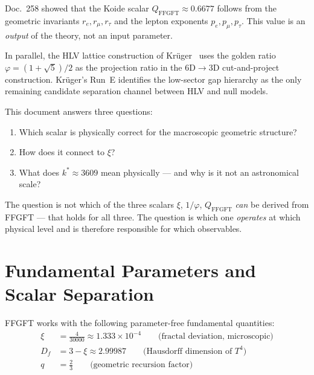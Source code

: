 Doc.~258 showed that the Koide scalar
$Q_\mathrm{FFGFT} \approx 0.6677$ follows from the geometric invariants
$r_e, r_\mu, r_\tau$ and the lepton exponents $p_e, p_\mu, p_\tau$.
This value is an \emph{output} of the theory, not an input parameter.

In parallel, the HLV lattice construction of Krüger~\cite{krueger275en}
uses the golden ratio $\varphi = (1+\sqrt{5})/2$ as the projection ratio
in the 6D$\to$3D cut-and-project construction. Krüger's Run~E identifies
the low-sector gap hierarchy as the only remaining candidate separation
channel between HLV and null models.

This document answers three questions:
\begin{enumerate}
  \item Which scalar is physically correct for the macroscopic geometric
        structure?
  \item How does it connect to $\xi$?
  \item What does $k^* \approx 3609$ mean physically --- and why is it
        not an astronomical scale?
\end{enumerate}

\begin{remark}
The question is not which of the three scalars $\xi$, $1/\varphi$,
$Q_\mathrm{FFGFT}$ \emph{can} be derived from FFGFT --- that holds for
all three. The question is which one \emph{operates} at which physical
level and is therefore responsible for which observables.
\end{remark}

\section{Fundamental Parameters and Scalar Separation}

FFGFT works with the following parameter-free fundamental quantities:
\begin{align}
  \xi   &= \frac{4}{30000} \approx 1.333 \times 10^{-4}
    \qquad \text{(fractal deviation, microscopic)} \label{eq:xi275en}\\
  D_f   &= 3 - \xi \approx 2.99987
    \qquad \text{(Hausdorff dimension of }T^4\text{)} \label{eq:Df275en}\\
  q     &= \frac{2}{3}
    \qquad \text{(geometric recursion factor)} \label{eq:q275en}
\end{align}


